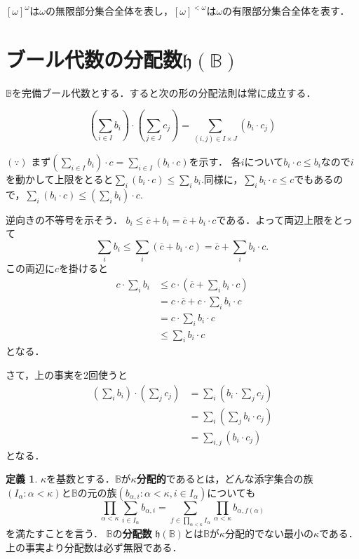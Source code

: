 \documentclass[uplatex,dvipdfmx]{jsarticle}
\newcommand{\B}{\mathbb{B}}
\newcommand{\h}{\mathfrak{h}}
\theoremstyle{definition}
\newtheorem*{defi*}{定義}
\theoremstyle{named}
\newenvironment{reason}
{
    \begin{mdframed}[backgroundcolor=reasonbg,linewidth=0]
    \color{reasontext}
    \small
}
{
    \end{mdframed}
}
\begin{document}
$[\omega]^\omega$は$\omega$の無限部分集合全体を表し，$[\omega]^{<\omega}$は$\omega$の有限部分集合全体を表す．

\section{ブール代数の分配数$\h(\B)$}

$\B$を完備ブール代数とする．すると次の形の分配法則は常に成立する．

\[
\left(\sum_{i \in I} b_i\right) \cdot \left(\sum_{j \in J} c_j\right) = \sum_{(i, j) \in I\times J} (b_i \cdot c_j)
\]

\begin{reason}
$(\because)$
まず$(\sum_{i \in I} b_i) \cdot c = \sum_{i \in I} (b_i \cdot c)$を示す．
各$i$について$b_i \cdot c \le b_i$なので$i$を動かして上限をとると$\sum_i (b_i \cdot c) \le \sum_i b_i$.同様に，$\sum_i b_i \cdot c \le c$でもあるので，$\sum_i (b_i \cdot c) \le (\sum_i b_i) \cdot c$.

逆向きの不等号を示そう．
$b_i \le \overline{c} + b_i = \overline{c} + b_i \cdot c$である．よって両辺上限をとって
\[
\sum_i b_i \le \sum_i (\overline{c} + b_i \cdot c) = \overline{c} + \sum_i b_i \cdot c.
\]
この両辺に$c$を掛けると
\begin{align*}
c \cdot \sum_i b_i &\le c \cdot (\overline{c} + \sum_i b_i \cdot c) \\
&= c \cdot \overline{c} + c \cdot\sum_i b_i \cdot c \\
&= c \cdot \sum_i b_i \cdot c \\
&\le \sum_i b_i \cdot c
\end{align*}
となる．

さて，上の事実を2回使うと
\begin{align*}
\left(\sum_i b_i\right) \cdot \left(\sum_j c_j\right) &= \sum_i \left(b_i \cdot \sum_j c_j\right) \\
&= \sum_i \left(\sum_j b_i \cdot c_j\right) \\
&= \sum_{i,j} \left( b_i \cdot c_j\right)
\end{align*}
となる．
\end{reason}

\begin{defi*}
$\kappa$を基数とする．$\B$が{\bfseries $\kappa$分配的}であるとは，どんな添字集合の族$(I_\alpha : \alpha < \kappa)$と$\B$の元の族$(b_{\alpha,i} : \alpha < \kappa, i \in I_\alpha)$についても
\[
\prod_{\alpha < \kappa} \sum_{i \in I_\alpha} b_{\alpha,i} = \sum_{f \in \prod_{\alpha < \kappa} I_\alpha} \prod_{\alpha < \kappa} b_{\alpha,f(\alpha)}
\]
を満たすことを言う．
$\B$の{\bfseries 分配数} $\h(\B)$とは$\B$が$\kappa$分配的でない最小の$\kappa$である．
上の事実より分配数は必ず無限である．
\end{defi*}
\end{document}
